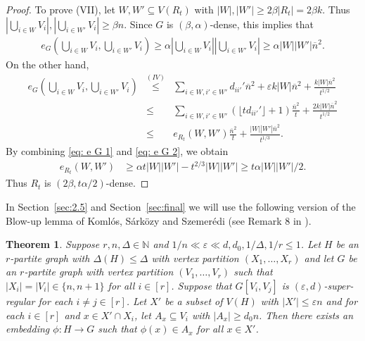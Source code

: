 \documentclass[a4paper, 11pt, reqno]{amsart}
\newtheorem{theorem}[definition]{Theorem}
\numberwithin{equation}{section}
\newcommand{\1}{{\rm 1\hspace*{-0.4ex}%
\rule{0.1ex}{1.52ex}\hspace*{0.2ex}}}
\newcommand{\N}{\mathbb N}
\renewcommand{\epsilon}{\varepsilon}
\begin{document}
\begin{proof}
To prove (VII), let $W,W' \subseteq V(R_t)$ with $|W|,|W'|\geq 2\beta |R_t|=2\beta k$.
Thus
$|\bigcup_{i\in W} V_i|, |\bigcup_{i\in W'} V_{i}|\geq \beta n$.
Since $G$ is $(\beta,\alpha)$-dense, this implies that
\begin{align}\label{eq: e G 1}
 e_G\left(\bigcup_{i\in W} V_i, \bigcup_{i\in W'} V_{i}\right) 
\geq \alpha \left|\bigcup_{i\in W} V_i\right|\left|\bigcup_{i\in W'} V_i\right| 
 \geq \alpha |W||W'|\overline{n}^2.
\end{align}
On the other hand, 
\begin{eqnarray}\label{eq: e G 2}
e_G\left(\bigcup_{i\in W} V_i, \bigcup_{i\in W'} V_{i}\right) 
&\stackrel{(IV)}{\leq}& \sum_{i\in W, i'\in W'} d_{ii'}'\overline{n}^2 + \epsilon k |W| \overline{n}^2 + \frac{k|W|\overline{n}^2}{t^{1/2}}\nonumber \\
 &\leq &\sum_{i\in W, i'\in W'} ( \lfloor t d_{ii'}' \rfloor + 1)\frac{\overline{n}^2}{t}  + \frac{2 k |W|\overline{n}^2}{t^{1/2}} \nonumber \\
 & \leq& e_{R_t}(W,W') \frac{\overline{n}^2}{t} + \frac{|W||W'|\overline{n}^2}{t^{1/3}}.
\end{eqnarray}
By combining \eqref{eq: e G 1} and \eqref{eq: e G 2}, we obtain
\begin{align*}
e_{R_t}(W,W') 
&\geq \alpha t |W||W'|  - t^{2/3}|W||W'| \geq t\alpha|W||W'|/2.
\end{align*}
Thus $R_t$ is $(2\beta,t\alpha/2)$-dense.
\end{proof}

In Section~\ref{sec:2.5} and Section~\ref{sec:final} we will use the following version of the Blow-up lemma of Koml\'{o}s, S\'{a}rk\"ozy and Szemer\'{e}di (see Remark 8 in \cite{KSS97}).

\begin{theorem} \label{blow up target sets}
Suppose $r,n, \Delta\in \N$ and $1/n \ll \epsilon \ll d,d_0,1/\Delta,1/r\leq 1$.
Let $H$ be an $r$-partite graph with $\Delta(H)\leq \Delta$ with vertex partition $(X_1,\dots, X_r)$ and 
let $G$ be an $r$-partite graph with vertex partition $(V_1,\dots, V_r)$ such that $|X_i|=|V_i| \in \{n,n+1\}$ for all $i\in [r]$.
Suppose that $G[V_i,V_j]$ is $(\epsilon,d)$-super-regular for each $i\neq j\in [r]$. 
Let $X'$ be a subset of $V(H)$ with $|X'|\leq \epsilon n$ and for each $i\in [r]$ and $x\in X'\cap X_i$, 
let $A_x\subseteq V_i$ with $|A_x|\geq d_0 n$. Then there exists an embedding $\phi : H\rightarrow G$ such that $\phi(x) \in A_{x}$ for all $x\in X'$.
\end{theorem}
\end{document}
